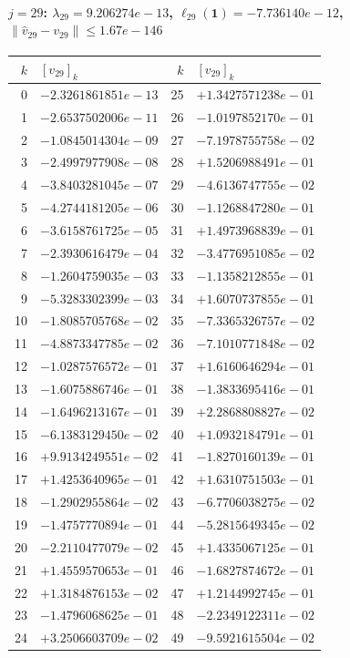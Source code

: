 \documentclass[11pt]{article}
\begin{document}
\paragraph{$j = 29$: $\lambda_{29} = 9.206274e-13$, \quad $\ell_{29}(\mathbf{1}) = -7.736140e-12$, \quad $\|\hat v_{29} - v_{29}\| \leq 1.67e-146$}
\begin{center}
{\footnotesize
\begin{tabular}{r@{\;\;}l@{\quad}r@{\;\;}l}
\toprule
$k$ & $[v_{29}]_k$ & $k$ & $[v_{29}]_k$ \\
\midrule
0 & $-2.3261861851e-13$ & 25 & $+1.3427571238e-01$ \\
1 & $-2.6537502006e-11$ & 26 & $-1.0197852170e-01$ \\
2 & $-1.0845014304e-09$ & 27 & $-7.1978755758e-02$ \\
3 & $-2.4997977908e-08$ & 28 & $+1.5206988491e-01$ \\
4 & $-3.8403281045e-07$ & 29 & $-4.6136747755e-02$ \\
5 & $-4.2744181205e-06$ & 30 & $-1.1268847280e-01$ \\
6 & $-3.6158761725e-05$ & 31 & $+1.4973968839e-01$ \\
7 & $-2.3930616479e-04$ & 32 & $-3.4776951085e-02$ \\
8 & $-1.2604759035e-03$ & 33 & $-1.1358212855e-01$ \\
9 & $-5.3283302399e-03$ & 34 & $+1.6070737855e-01$ \\
10 & $-1.8085705768e-02$ & 35 & $-7.3365326757e-02$ \\
11 & $-4.8873347785e-02$ & 36 & $-7.1010771848e-02$ \\
12 & $-1.0287576572e-01$ & 37 & $+1.6160646294e-01$ \\
13 & $-1.6075886746e-01$ & 38 & $-1.3833695416e-01$ \\
14 & $-1.6496213167e-01$ & 39 & $+2.2868808827e-02$ \\
15 & $-6.1383129450e-02$ & 40 & $+1.0932184791e-01$ \\
16 & $+9.9134249551e-02$ & 41 & $-1.8270160139e-01$ \\
17 & $+1.4253640965e-01$ & 42 & $+1.6310751503e-01$ \\
18 & $-1.2902955864e-02$ & 43 & $-6.7706038275e-02$ \\
19 & $-1.4757770894e-01$ & 44 & $-5.2815649345e-02$ \\
20 & $-2.2110477079e-02$ & 45 & $+1.4335067125e-01$ \\
21 & $+1.4559570653e-01$ & 46 & $-1.6827874672e-01$ \\
22 & $+1.3184876153e-02$ & 47 & $+1.2144992745e-01$ \\
23 & $-1.4796068625e-01$ & 48 & $-2.2349122311e-02$ \\
24 & $+3.2506603709e-02$ & 49 & $-9.5921615504e-02$ \\
\bottomrule
\end{tabular}
}
\end{center}
\end{document}
